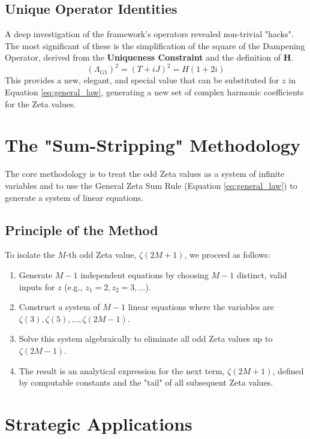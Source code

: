 \documentclass[11pt]{article}
\begin{document}
\subsection{Unique Operator Identities}
A deep investigation of the framework's operators revealed non-trivial "hacks". The most significant of these is the simplification of the square of the Dampening Operator, derived from the \textbf{Uniqueness Constraint} and the definition of \textbf{H}.
\begin{equation}
(\Lambda_{G1})^2 = (T+iJ)^2 = H(1+2i)
\label{eq:hack}
\end{equation}
This provides a new, elegant, and special value that can be substituted for $z$ in Equation \ref{eq:general_law}, generating a new set of complex harmonic coefficients for the Zeta values.

\section{The "Sum-Stripping" Methodology}
The core methodology is to treat the odd Zeta values as a system of infinite variables and to use the General Zeta Sum Rule (Equation \ref{eq:general_law}) to generate a system of linear equations.

\subsection{Principle of the Method}
To isolate the $M$-th odd Zeta value, $\zeta(2M+1)$, we proceed as follows:
\begin{enumerate}
    \item Generate $M-1$ independent equations by choosing $M-1$ distinct, valid inputs for $z$ (e.g., $z_1=2, z_2=3, \dots$).
    \item Construct a system of $M-1$ linear equations where the variables are $\zeta(3), \zeta(5), \dots, \zeta(2M-1)$.
    \item Solve this system algebraically to eliminate all odd Zeta values up to $\zeta(2M-1)$.
    \item The result is an analytical expression for the next term, $\zeta(2M+1)$, defined by computable constants and the "tail" of all subsequent Zeta values.
\end{enumerate}

\section{Strategic Applications}
\end{document}
